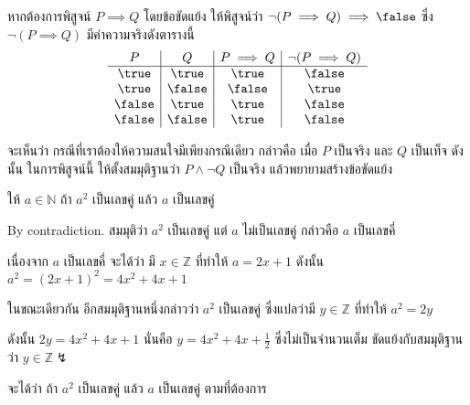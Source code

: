 \begin{example}
หากต้องการพิสูจน์ $P\implies Q$ โดยข้อขัดแย้ง ให้พิสูจน์ว่า $\neg(P\implies Q)\implies\false$ ซึ่ง $\neg(P\implies Q)$ มีค่าความจริงดังตารางนี้
\[
\begin{array}{c|c|c|c}
P & Q & P\implies Q & \neg(P\implies Q) \\\hline
\true & \true & \true & \false \\
\true & \false & \false & \true \\
\false & \true & \true & \false \\
\false & \false & \true & \false \\
\end{array}
\]

จะเห็นว่า กรณีที่เราต้องให้ความสนใจมีเพียงกรณีเดียว กล่าวคือ เมื่อ $P$ เป็นจริง และ $Q$ เป็นเท็จ ดังนั้น ในการพิสูจน์นี้ ให้ตั้งสมมุติฐานว่า $P\wedge\neg Q$ เป็นจริง แล้วพยายามสร้างข้อขัดแย้ง
\end{example}

\begin{theorem}\label{thm:sq-e-e}
ให้ $a\in\mathbb{N}$ ถ้า $a^2$ เป็นเลขคู่ แล้ว $a$ เป็นเลขคู่
\begin{pf}
By contradiction. สมมุติว่า $a^2$ เป็นเลขคู่ แต่ $a$ ไม่เป็นเลขคู่ กล่าวคือ $a$ เป็นเลขคี่

เนื่องจาก $a$ เป็นเลขคี่ จะได้ว่า มี $x\in\mathbb{Z}$ ที่ทำให้ $a=2x+1$ ดังนั้น $a^2=(2x+1)^2=4x^2+4x+1$

ในขณะเดียวกัน อีกสมมุติฐานหนึ่งกล่าวว่า $a^2$ เป็นเลขคู่ ซึ่งแปลว่ามี $y\in\mathbb{Z}$ ที่ทำให้ $a^2=2y$

ดังนั้น $2y=4x^2+4x+1$ นั่นคือ $y=4x^2+4x+\frac{1}{2}$ ซึ่งไม่เป็นจำนวนเต็ม ขัดแย้งกับสมมุติฐานว่า $y\in\mathbb{Z} \lightning$

จะได้ว่า ถ้า $a^2$ เป็นเลขคู่ แล้ว $a$ เป็นเลขคู่ ตามที่ต้องการ
\end{pf}
\end{theorem}

